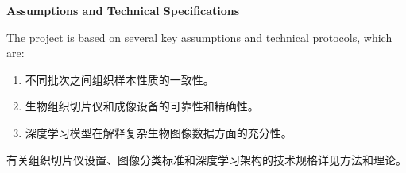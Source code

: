 \textbf{Assumptions and Technical Specifications}

The project is based on several key assumptions and technical protocols, which are:


\begin{enumerate}
    \item 不同批次之间组织样本性质的一致性。
    \item 生物组织切片仪和成像设备的可靠性和精确性。
    \item 深度学习模型在解释复杂生物图像数据方面的充分性。
\end{enumerate}
有关组织切片仪设置、图像分类标准和深度学习架构的技术规格详见方法和理论。

